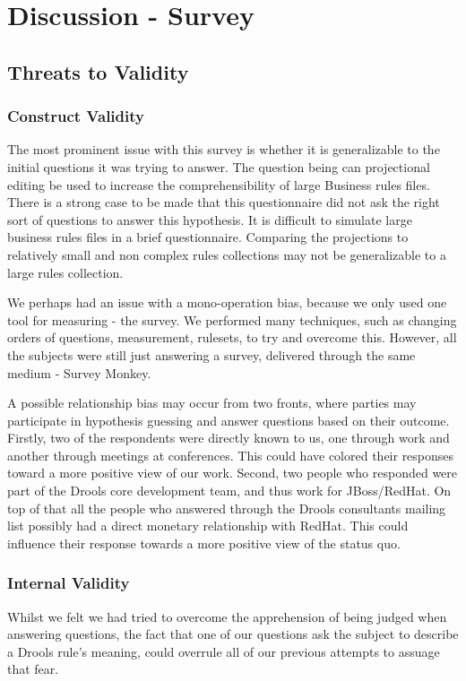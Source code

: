 \section{Discussion - Survey}

\subsection{Threats to Validity}  

\subsubsection{Construct Validity}
The most prominent issue with this survey is whether it is generalizable to the initial questions it was trying to answer.
The question being can projectional editing be used to increase the comprehensibility of large Business rules files.
There is a strong case to be made that this questionnaire did not ask the right sort of questions to answer this hypothesis.
It is difficult to simulate large business rules files in a brief questionnaire.
Comparing the projections to relatively small and non complex rules collections may not be generalizable to a large rules collection.

We perhaps had an issue with a mono-operation bias, because we only used one tool for measuring - the survey.
We performed many techniques, such as changing orders of questions, measurement, rulesets, to try and overcome this.
However, all the subjects were still just answering a survey, delivered through the same medium - Survey Monkey.

A possible relationship bias may occur from two fronts, where parties may participate in hypothesis guessing and answer questions based on their outcome.
Firstly, two of the respondents were directly known to us, one through work and another through meetings at conferences.
This could have colored their responses toward a more positive view of our work.
Second, two people who responded were part of the Drools core development team, and thus work for JBoss/RedHat.
On top of that all the people who answered through the Drools consultants mailing list possibly had a direct monetary relationship with RedHat.
This could influence their response towards a more positive view of the status quo.

\subsubsection{Internal Validity}
Whilst we felt we had tried to overcome the apprehension of being judged when answering questions, the fact that one of our questions ask the subject to describe a Drools rule's meaning, could overrule all of our previous attempts to assuage that fear.

